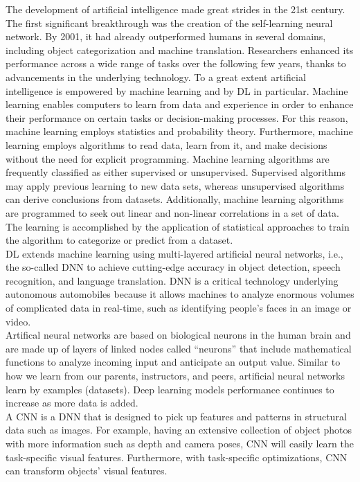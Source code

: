 The development of artificial intelligence made great strides in the 21st century.
The first significant breakthrough was the creation of the self-learning neural network.
By 2001, it had already outperformed humans in several domains, including object categorization and machine translation.
Researchers enhanced its performance across a wide range of tasks over the following few years, thanks to advancements in the underlying technology.
To a great extent artificial intelligence is empowered by machine learning and by \ac{DL} in particular.
Machine learning enables computers to learn from data and experience in order to enhance their performance on certain tasks or decision-making processes.
For this reason, machine learning employs statistics and probability theory.
Furthermore, machine learning employs algorithms to read data, learn from it, and make decisions without the need for explicit programming.
Machine learning algorithms are frequently classified as either supervised or unsupervised.
Supervised algorithms may apply previous learning to new data sets, whereas unsupervised algorithms can derive conclusions from datasets.
Additionally, machine learning algorithms are programmed to seek out linear and non-linear correlations in a set of data.
The learning is accomplished by the application of statistical approaches to train the algorithm to categorize or predict from a dataset.\\

\ac{DL} extends machine learning using multi-layered artificial neural networks, i.e., the so-called \ac{DNN} to achieve cutting-edge accuracy in object detection,
speech recognition, and language translation.
\ac{DNN} is a critical technology underlying autonomous automobiles because it allows machines to analyze enormous volumes of complicated data in real-time,
such as identifying people's faces in an image or video.\\

Artifical neural networks are based on biological neurons in the human brain and are made up of layers of linked nodes called ``neurons'' that include mathematical
functions to analyze incoming input and anticipate an output value. Similar to how we learn from our parents, instructors, and peers, artificial neural networks
learn by examples (datasets). Deep learning models performance continues to increase as more data is added.\\

A \ac{CNN} is a \ac{DNN} that is designed to pick up features
and patterns in structural data such as images. For example, having an extensive collection of object
photos with more information such as depth and camera poses, \ac{CNN} will easily learn the task-specific visual features. Furthermore,
with task-specific optimizations, \ac{CNN} can transform objects' visual features. \\

